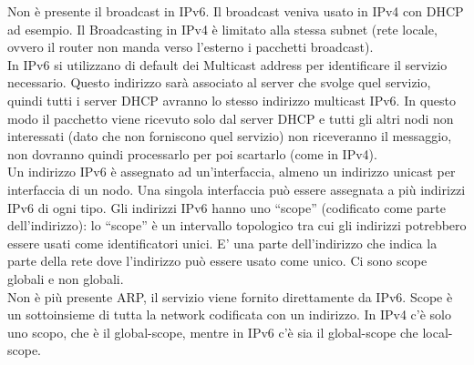 \documentclass{article}
\begin{document}
Non è presente il broadcast in IPv6. Il broadcast veniva usato in IPv4 con DHCP ad esempio. Il Broadcasting in IPv4 è limitato alla stessa subnet (rete locale, ovvero il router non manda verso l’esterno i pacchetti broadcast). \\
In IPv6 si utilizzano di default dei Multicast address per identificare il servizio necessario. Questo indirizzo sarà associato al server che svolge quel servizio, quindi tutti i server DHCP avranno lo stesso indirizzo multicast IPv6. In questo modo il pacchetto viene ricevuto solo dal server DHCP e tutti gli altri nodi non interessati (dato che non forniscono quel servizio) non riceveranno il messaggio, non dovranno quindi processarlo per poi scartarlo (come in IPv4).\\
Un indirizzo IPv6 è assegnato ad un’interfaccia, almeno un indirizzo unicast per interfaccia di un nodo. Una singola interfaccia può essere assegnata a più indirizzi IPv6 di ogni tipo. 
Gli indirizzi IPv6 hanno uno “scope” (codificato come parte dell’indirizzo): lo “scope” è un intervallo topologico tra cui gli indirizzi potrebbero essere usati come identificatori unici. E’ una parte dell’indirizzo che indica la parte della rete dove l’indirizzo può essere usato come unico.
Ci sono scope globali e non globali.\\
Non è più presente ARP, il servizio viene fornito direttamente da IPv6. Scope è un sottoinsieme di tutta la network codificata con un indirizzo.
In IPv4 c’è solo uno scopo, che è il global-scope, mentre in IPv6 c’è sia il global-scope che local-scope.
\end{document}
